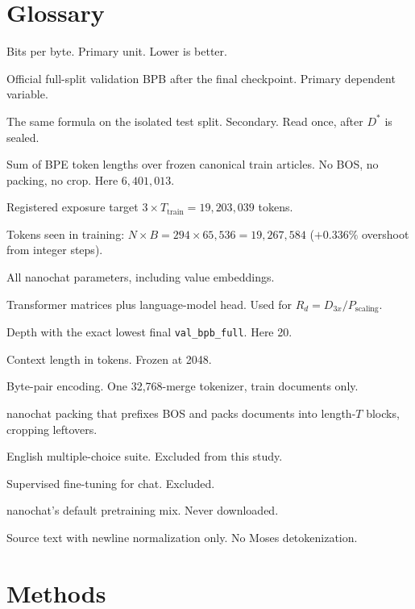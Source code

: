 \documentclass[11pt,a4paper]{article}
\begin{document}
\section{Glossary}
\label{sec:glossary}

\begin{description}[style=nextline,leftmargin=1.25em]
\item[BPB] Bits per byte. Primary unit. Lower is better.
\item[\texttt{val\_bpb\_full}] Official full-split validation BPB after the final checkpoint. Primary dependent variable.
\item[\texttt{test\_bpb}] The same formula on the isolated test split. Secondary. Read once, after $D^{\ast}$ is sealed.
\item[$T_{\mathrm{train}}$] Sum of BPE token lengths over frozen canonical train articles. No BOS, no packing, no crop. Here $6{,}401{,}013$.
\item[$D_{3x}$] Registered exposure target $3\times T_{\mathrm{train}}=19{,}203{,}039$ tokens.
\item[$D_{\mathrm{actual}}$] Tokens seen in training: $N\times B=294\times 65{,}536=19{,}267{,}584$ ($+0.336\%$ overshoot from integer steps).
\item[$P_{\mathrm{total}}$] All nanochat parameters, including value embeddings.
\item[$P_{\mathrm{scaling}}$] Transformer matrices plus language-model head. Used for $R_d=D_{3x}/P_{\mathrm{scaling}}$.
\item[$D^{\ast}$] Depth with the exact lowest final \texttt{val\_bpb\_full}. Here 20.
\item[$T$] Context length in tokens. Frozen at 2048.
\item[BPE] Byte-pair encoding. One 32{,}768-merge tokenizer, train documents only.
\item[BOS-bestfit] nanochat packing that prefixes BOS and packs documents into length-$T$ blocks, cropping leftovers.
\item[CORE] English multiple-choice suite. Excluded from this study.
\item[SFT] Supervised fine-tuning for chat. Excluded.
\item[ClimbMix] nanochat's default pretraining mix. Never downloaded.
\item[LF-only canonical] Source text with newline normalization only. No Moses detokenization.
\end{description}

\section{Methods}
\label{sec:methods}
\end{document}
